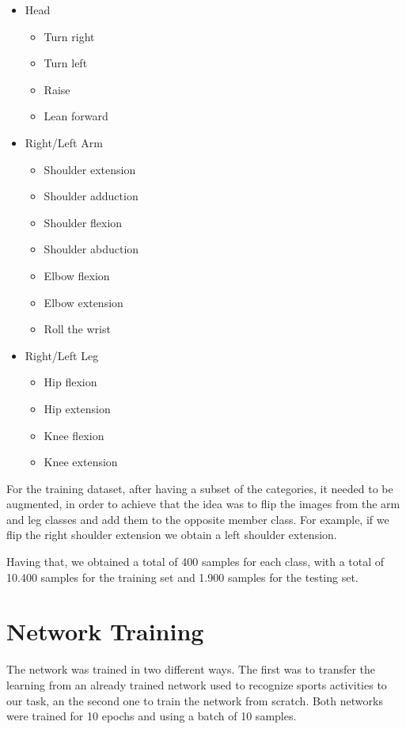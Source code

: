 \documentclass{article}
\begin{document}
\begin{itemize}
	\item Head
		\begin{itemize}
			\item Turn right
			\item Turn left
			\item Raise
			\item Lean forward
		\end{itemize}
	\item Right/Left Arm
		\begin{itemize}
			\item Shoulder extension
			\item Shoulder adduction
			\item Shoulder flexion
			\item Shoulder abduction
			\item Elbow flexion
			\item Elbow extension
			\item Roll the wrist
		\end{itemize}
	\item Right/Left Leg
		\begin{itemize}
			\item Hip flexion
			\item Hip extension
			\item Knee flexion
			\item Knee extension
		\end{itemize}
\end{itemize}

For the training dataset, after having a subset of the categories, it needed to be augmented, in order to achieve that the idea was to flip the images from the arm and leg classes and add them to the opposite member class. For example, if we flip the right shoulder extension we obtain a left shoulder extension.

Having that, we obtained a total of 400 samples for each class, with a total of 10.400 samples for the training set and 1.900 samples for the testing set.


\section{Network Training}

The network was trained in two different ways. The first was to transfer the learning from an already trained network used to recognize sports activities to our task, an the second one to train the network from scratch. Both networks were trained for 10 epochs and using a batch of 10 samples.
\end{document}
